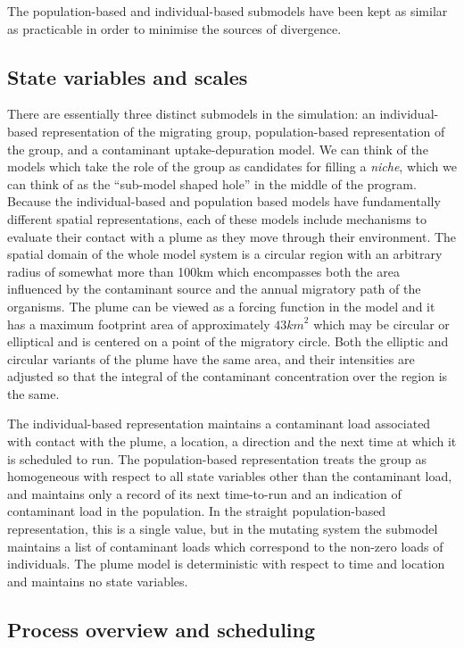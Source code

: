 The population-based and individual-based submodels have been kept as similar
as practicable in order to minimise the sources of divergence.

\subsection{State variables and scales}

There are essentially three distinct submodels in the simulation: an
individual-based representation of the migrating group, population-based
representation of the group, and a contaminant uptake-depuration model. We can
think of the models which take the role of the group as candidates for filling
a {\em{niche}\/}\label{Niche}, which we can think of as the ``sub-model shaped
hole'' in the middle of the program. Because the individual-based and
population based models have fundamentally different spatial representations,
each of these models include mechanisms to evaluate their contact with a plume
as they move through their environment. The spatial domain of the whole model
system is a circular region with an arbitrary radius of somewhat more than
100km which encompasses both the area influenced by the contaminant source and
the annual migratory path of the organisms. The plume can be viewed as a
forcing function in the model and it has a maximum footprint area of
approximately $43 {km}^2$ which may be circular or elliptical and is
centered on a point of the migratory circle. Both the elliptic and circular
variants of the plume have the same area, and their intensities are adjusted
so that the integral of the contaminant concentration over the region is the
same.

The individual-based representation maintains a contaminant load associated
with contact with the plume, a location, a direction and the next time at
which it is scheduled to run. The population-based representation treats the
group as homogeneous with respect to all state variables other than the
contaminant load, and maintains only a record of its next time-to-run and an
indication of contaminant load in the population. In the straight
population-based representation, this is a single value, but in the mutating
system the submodel maintains a list of contaminant loads which correspond to
the non-zero loads of individuals. The plume model is deterministic with
respect to time and location and maintains no state variables.

\subsection{Process overview and scheduling}

